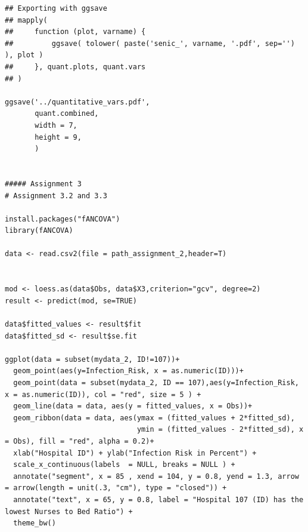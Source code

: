 \documentclass[11pt]{article}
\begin{document}
\begin{lstlisting}
## Exporting with ggsave
## mapply(
##     function (plot, varname) {
##         ggsave( tolower( paste('senic_', varname, '.pdf', sep='') ), plot )
##     }, quant.plots, quant.vars
## )

ggsave('../quantitative_vars.pdf',
       quant.combined,
       width = 7,
       height = 9,
       )


##### Assignment 3
# Assignment 3.2 and 3.3

install.packages("fANCOVA")
library(fANCOVA)

data <- read.csv2(file = path_assignment_2,header=T)


mod <- loess.as(data$Obs, data$X3,criterion="gcv", degree=2) 
result <- predict(mod, se=TRUE)

data$fitted_values <- result$fit
data$fitted_sd <- result$se.fit

ggplot(data = subset(mydata_2, ID!=107))+
  geom_point(aes(y=Infection_Risk, x = as.numeric(ID)))+
  geom_point(data = subset(mydata_2, ID == 107),aes(y=Infection_Risk, x = as.numeric(ID)), col = "red", size = 5 ) +
  geom_line(data = data, aes(y = fitted_values, x = Obs))+
  geom_ribbon(data = data, aes(ymax = (fitted_values + 2*fitted_sd),
                               ymin = (fitted_values - 2*fitted_sd), x = Obs), fill = "red", alpha = 0.2)+
  xlab("Hospital ID") + ylab("Infection Risk in Percent") + 
  scale_x_continuous(labels  = NULL, breaks = NULL ) + 
  annotate("segment", x = 85 , xend = 104, y = 0.8, yend = 1.3, arrow = arrow(length = unit(.3, "cm"), type = "closed")) + 
  annotate("text", x = 65, y = 0.8, label = "Hospital 107 (ID) has the lowest Nurses to Bed Ratio") +
  theme_bw()

\end{lstlisting}
\end{document}
